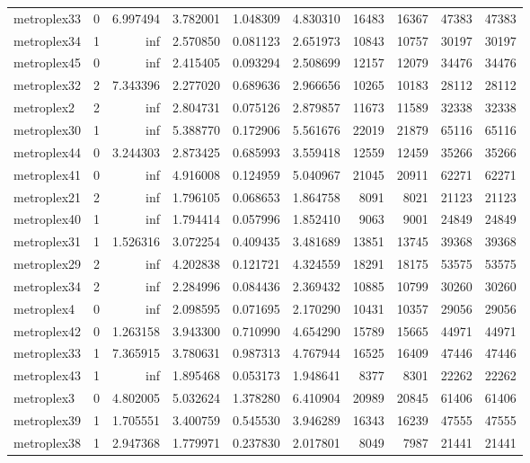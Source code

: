 \begin{longtable}{|l|r|r|r|r|r|r|r|r|r|}
metroplex33 & 0 & 6.997494 & 3.782001 & 1.048309 & 4.830310 & 16483 & 16367 & 47383 & 47383 \\
metroplex34 & 1 & inf & 2.570850 & 0.081123 & 2.651973 & 10843 & 10757 & 30197 & 30197 \\
metroplex45 & 0 & inf & 2.415405 & 0.093294 & 2.508699 & 12157 & 12079 & 34476 & 34476 \\
metroplex32 & 2 & 7.343396 & 2.277020 & 0.689636 & 2.966656 & 10265 & 10183 & 28112 & 28112 \\
metroplex2 & 2 & inf & 2.804731 & 0.075126 & 2.879857 & 11673 & 11589 & 32338 & 32338 \\
metroplex30 & 1 & inf & 5.388770 & 0.172906 & 5.561676 & 22019 & 21879 & 65116 & 65116 \\
metroplex44 & 0 & 3.244303 & 2.873425 & 0.685993 & 3.559418 & 12559 & 12459 & 35266 & 35266 \\
metroplex41 & 0 & inf & 4.916008 & 0.124959 & 5.040967 & 21045 & 20911 & 62271 & 62271 \\
metroplex21 & 2 & inf & 1.796105 & 0.068653 & 1.864758 & 8091 & 8021 & 21123 & 21123 \\
metroplex40 & 1 & inf & 1.794414 & 0.057996 & 1.852410 & 9063 & 9001 & 24849 & 24849 \\
metroplex31 & 1 & 1.526316 & 3.072254 & 0.409435 & 3.481689 & 13851 & 13745 & 39368 & 39368 \\
metroplex29 & 2 & inf & 4.202838 & 0.121721 & 4.324559 & 18291 & 18175 & 53575 & 53575 \\
metroplex34 & 2 & inf & 2.284996 & 0.084436 & 2.369432 & 10885 & 10799 & 30260 & 30260 \\
metroplex4 & 0 & inf & 2.098595 & 0.071695 & 2.170290 & 10431 & 10357 & 29056 & 29056 \\
metroplex42 & 0 & 1.263158 & 3.943300 & 0.710990 & 4.654290 & 15789 & 15665 & 44971 & 44971 \\
metroplex33 & 1 & 7.365915 & 3.780631 & 0.987313 & 4.767944 & 16525 & 16409 & 47446 & 47446 \\
metroplex43 & 1 & inf & 1.895468 & 0.053173 & 1.948641 & 8377 & 8301 & 22262 & 22262 \\
metroplex3 & 0 & 4.802005 & 5.032624 & 1.378280 & 6.410904 & 20989 & 20845 & 61406 & 61406 \\
metroplex39 & 1 & 1.705551 & 3.400759 & 0.545530 & 3.946289 & 16343 & 16239 & 47555 & 47555 \\
metroplex38 & 1 & 2.947368 & 1.779971 & 0.237830 & 2.017801 & 8049 & 7987 & 21441 & 21441 \\

\end{longtable}
